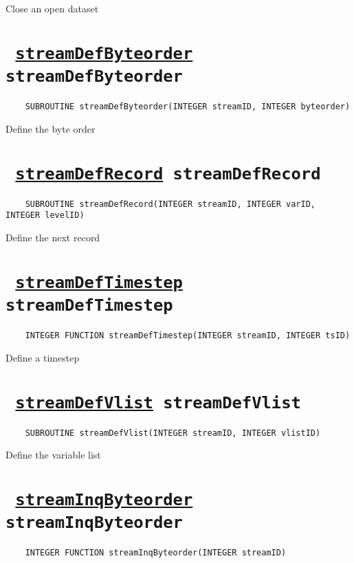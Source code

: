 Close an open dataset
\ifpdfoutput{}{(\ref{streamClose})}


\section*{\texttt{ 
\ifpdf
\hyperref[streamDefByteorder]{streamDefByteorder}
\else
streamDefByteorder
\fi
}}
\begin{verbatim}
    SUBROUTINE streamDefByteorder(INTEGER streamID, INTEGER byteorder)
\end{verbatim}

Define the byte order
\ifpdfoutput{}{(\ref{streamDefByteorder})}


\section*{\texttt{ 
\ifpdf
\hyperref[streamDefRecord]{streamDefRecord}
\else
streamDefRecord
\fi
}}
\begin{verbatim}
    SUBROUTINE streamDefRecord(INTEGER streamID, INTEGER varID, INTEGER levelID)
\end{verbatim}

Define the next record
\ifpdfoutput{}{(\ref{streamDefRecord})}


\section*{\texttt{ 
\ifpdf
\hyperref[streamDefTimestep]{streamDefTimestep}
\else
streamDefTimestep
\fi
}}
\begin{verbatim}
    INTEGER FUNCTION streamDefTimestep(INTEGER streamID, INTEGER tsID)
\end{verbatim}

Define a timestep
\ifpdfoutput{}{(\ref{streamDefTimestep})}


\section*{\texttt{ 
\ifpdf
\hyperref[streamDefVlist]{streamDefVlist}
\else
streamDefVlist
\fi
}}
\begin{verbatim}
    SUBROUTINE streamDefVlist(INTEGER streamID, INTEGER vlistID)
\end{verbatim}

Define the variable list
\ifpdfoutput{}{(\ref{streamDefVlist})}


\section*{\texttt{ 
\ifpdf
\hyperref[streamInqByteorder]{streamInqByteorder}
\else
streamInqByteorder
\fi
}}
\begin{verbatim}
    INTEGER FUNCTION streamInqByteorder(INTEGER streamID)
\end{verbatim}

